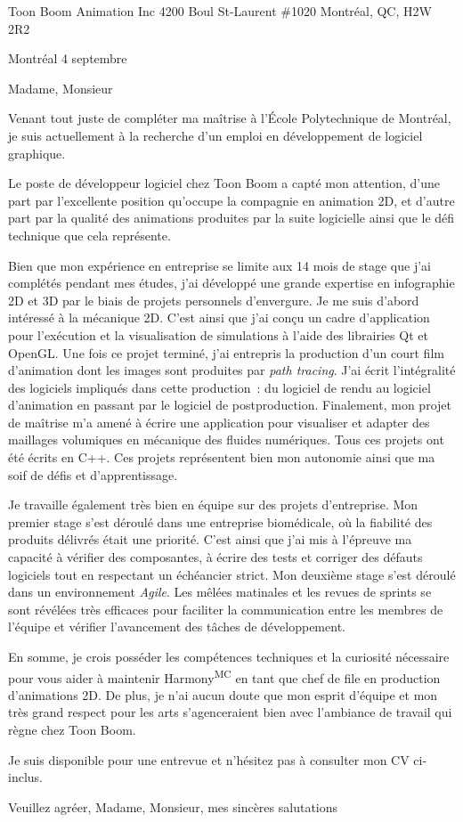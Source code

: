 \insertcvheader
\clurecipient
 {Toon Boom Animation Inc}
 {4200 Boul St-Laurent \#1020}
 {Montréal, QC, H2W 2R2}
 
\cllocationdate
 {Montréal}
 {4 septembre}
 
\clgreeting
 {Madame, Monsieur}
 
Venant tout juste de compléter ma maîtrise à l’École Polytechnique de Montréal, je suis actuellement à la recherche d’un emploi en développement de logiciel graphique.

Le poste de développeur logiciel chez Toon Boom a capté mon attention, d’une part par l’excellente position qu’occupe la compagnie en animation 2D, et d’autre part par la qualité des animations produites par la suite logicielle ainsi que le défi technique que cela représente.
 
Bien que mon expérience en entreprise se limite aux 14 mois de stage que j’ai complétés pendant mes études, j’ai développé une grande expertise en infographie 2D et 3D par le biais de projets personnels d’envergure. Je me suis d’abord intéressé à la mécanique 2D. C’est ainsi que j’ai conçu un cadre d’application pour l’exécution et la visualisation de simulations à l’aide des librairies Qt et OpenGL. Une fois ce projet terminé, j’ai entrepris la production d’un court film d’animation dont les images sont produites par \textit{path tracing}. J’ai écrit l’intégralité des logiciels impliqués dans cette production~: du logiciel de rendu au logiciel d’animation en passant par le logiciel de postproduction. Finalement, mon projet de maîtrise m’a amené à écrire une application pour visualiser et adapter des maillages volumiques en mécanique des fluides numériques. Tous ces projets ont été écrits en C++. Ces projets représentent bien mon autonomie ainsi que ma soif de défis et d’apprentissage.

Je travaille également très bien en équipe sur des projets d’entreprise. Mon premier stage s’est déroulé dans une entreprise biomédicale, où la fiabilité des produits délivrés était une priorité. C’est ainsi que j’ai mis à l’épreuve ma capacité à vérifier des composantes, à écrire des tests et corriger des défauts logiciels tout en respectant un échéancier strict. Mon deuxième stage s’est déroulé dans un environnement \textit{Agile}. Les mêlées matinales et les revues de sprints se sont révélées très efficaces pour faciliter la communication entre les membres de l’équipe et vérifier l’avancement des tâches de développement.

En somme, je crois posséder les compétences techniques et la curiosité nécessaire pour vous aider à maintenir Harmony\textsuperscript{MC} en tant que chef de file en production d’animations 2D. De plus, je n’ai aucun doute que mon esprit d’équipe et mon très grand respect pour les arts s’agenceraient bien avec l’ambiance de travail qui règne chez Toon Boom. 

Je suis disponible pour une entrevue et n’hésitez pas à consulter mon CV ci-inclus.

Veuillez agréer, Madame, Monsieur, mes sincères salutations

